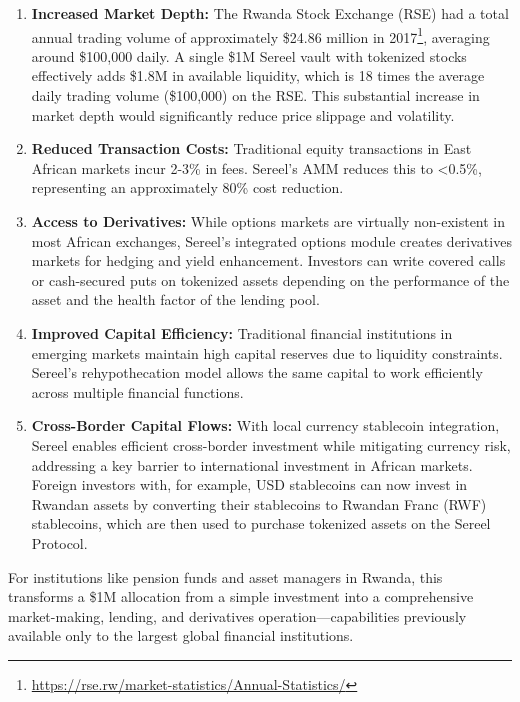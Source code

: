 \documentclass[12pt]{article}
\begin{document}
\begin{enumerate}
    \item \textbf{Increased Market Depth:} The Rwanda Stock Exchange (RSE) had a total annual trading volume of approximately \$24.86 million in 2017\footnote{\url{https://rse.rw/market-statistics/Annual-Statistics/}}, averaging around \$100,000 daily. A single \$1M Sereel vault with tokenized stocks effectively adds \$1.8M in available liquidity, which is 18 times the average daily trading volume (\$100,000) on the RSE. This substantial increase in market depth would significantly reduce price slippage and volatility.
  
  \item \textbf{Reduced Transaction Costs:} Traditional equity transactions in East African markets incur 2-3\% in fees. Sereel's AMM reduces this to \textless 0.5\%, representing an approximately 80\% cost reduction.

  \item \textbf{Access to Derivatives:} While options markets are virtually non-existent in most African exchanges, Sereel's integrated options module creates derivatives markets for hedging and yield enhancement. Investors can write covered calls or cash-secured puts on tokenized assets depending on the performance of the asset and the health factor of the lending pool.

  \item \textbf{Improved Capital Efficiency:} Traditional financial institutions in emerging markets maintain high capital reserves due to liquidity constraints. Sereel's rehypothecation model allows the same capital to work efficiently across multiple financial functions.
  
  \item \textbf{Cross-Border Capital Flows:} With local currency stablecoin integration, Sereel enables efficient cross-border investment while mitigating currency risk, addressing a key barrier to international investment in African markets. Foreign investors with, for example, USD stablecoins can now invest in Rwandan assets by converting their stablecoins to Rwandan Franc (RWF) stablecoins, which are then used to purchase tokenized assets on the Sereel Protocol.
\end{enumerate}

For institutions like pension funds and asset managers in Rwanda, this transforms a \$1M allocation from a simple investment into a comprehensive market-making, lending, and derivatives operation—capabilities previously available only to the largest global financial institutions.
\end{document}
